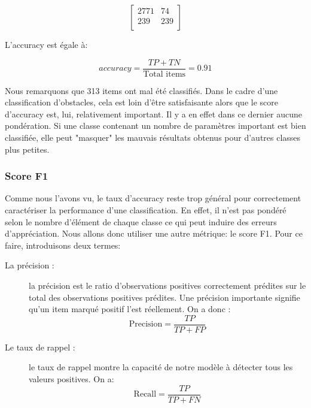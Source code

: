 \documentclass[a4paper]{report}
\begin{document}
$$\begin{bmatrix}
2771 & 74 \\ 
239 & 239 \\
\end{bmatrix}$$

\bigskip
L'accuracy est égale à:

\begin{equation}
 accuracy=\dfrac{TP+TN}{\text{Total items}}= 0.91
\end{equation}

\medskip

Nous remarquons que 313 items ont mal été classifiés. Dans le cadre d'une classification d'obstacles, cela est loin d'être satisfaisante alors que le score d'accuracy est, lui, relativement important. Il y a en effet dans ce dernier aucune pondération. Si une classe contenant un nombre de paramètres important est bien classifiée, elle peut "masquer" les mauvais résultats obtenus pour d'autres classes plus petites.

\subsubsection{Score F1}
Comme nous l'avons vu, le taux d'accuracy reste trop général pour correctement caractériser la performance d'une classification. En effet, il n'est pas pondéré selon le nombre d'élément de chaque classe ce qui peut induire des erreurs d'appréciation. Nous allons donc utiliser une autre métrique: le score F1. Pour ce faire, introduisons deux termes:

\begin{description}
\item[La précision :] la précision est le ratio d'observations positives correctement prédites sur le total des observations positives prédites. Une précision importante signifie qu'un item marqué positif l'est réellement. On a donc : \begin{equation}
\text{Precision} = \dfrac{TP}{TP+FP}
\end{equation}
\item[Le taux de rappel :] le taux de rappel montre la capacité de notre modèle à détecter tous les valeurs positives. On a: \begin{equation}
\text{Recall} = \dfrac{TP}{TP+FN}
\end{equation}
\end{description}
\end{document}

